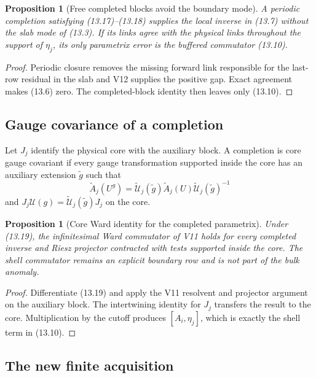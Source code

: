 \documentclass[11pt]{article}
\newtheorem{proposition}[theorem]{Proposition}
\begin{document}
\begin{proposition}[Free completed blocks avoid the boundary mode]
\label{prop:v11v13-free-completion}
A periodic completion satisfying (13.17)--(13.18) supplies the local
inverse in (13.7) without the slab mode of (13.3).  If its links agree
with the physical links throughout the support of \(\eta_j\), its only
parametrix error is the buffered commutator (13.10).
\end{proposition}

\begin{proof}
Periodic closure removes the missing forward link responsible for the
last-row residual in the slab and V12 supplies the positive gap.  Exact
agreement makes (13.6) zero.  The completed-block identity then leaves
only (13.10).
\end{proof}

\subsection{Gauge covariance of a completion}

Let \(J_j\) identify the physical core with the auxiliary block.  A
completion is core gauge covariant if every gauge transformation supported
inside the core has an auxiliary extension \(\widetilde g\) such that
\[
 \widetilde A_j(U^{g})
 =
 \widetilde{\mathcal U}_j(\widetilde g)
 \widetilde A_j(U)
 \widetilde{\mathcal U}_j(\widetilde g)^{-1}
 \tag{13.19}
\]
and \(J_j\mathcal U(g)=\widetilde{\mathcal U}_j(\widetilde g)J_j\) on
the core.

\begin{proposition}[Core Ward identity for the completed parametrix]
\label{prop:v11v13-core-ward}
Under (13.19), the infinitesimal Ward commutator of V11 holds for every
completed inverse and Riesz projector contracted with tests supported
inside the core.  The shell commutator remains an explicit boundary row
and is not part of the bulk anomaly.
\end{proposition}

\begin{proof}
Differentiate (13.19) and apply the V11 resolvent and projector argument
on the auxiliary block.  The intertwining identity for \(J_j\) transfers
the result to the core.  Multiplication by the cutoff produces
\([A_i,\eta_j]\), which is exactly the shell term in (13.10).
\end{proof}

\subsection{The new finite acquisition}
\end{document}
